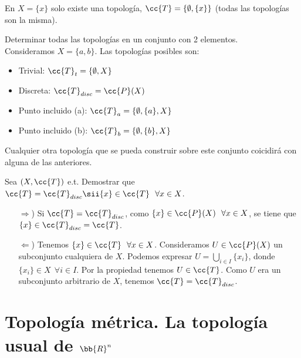 \begin{observacion}
    En $X=\{x\}$ solo existe una topología, $\cc{T}=\{\emptyset, \{x\}\}$ (todas las topologías son la misma).
    \endsquare
\end{observacion}

\begin{ejercicio}
    Determinar todas las topologías en un conjunto con 2 elementos.\\

    Consideramos $X=\{a,b\}$. Las topologías posibles son:
    \begin{itemize}
        \item Trivial: $\cc{T}_t=\{\emptyset, X\}$
        \item Discreta: $\cc{T}_{disc}=\cc{P}(X)$
        \item Punto incluido (a): $\cc{T}_a = \{\emptyset, \{a\}, X\}$
        \item Punto incluido (b): $\cc{T}_b = \{\emptyset, \{b\}, X\}$
    \end{itemize}
    Cualquier otra topología que se pueda construir sobre este conjunto coicidirá con alguna de las anteriores.
    \endsquare
\end{ejercicio}

\begin{ejercicio}
    Sea $(X, \cc{T})$ e.t. Demostrar que $\cc{T}=\cc{T}_{disc} \sii \{x\}\in \cc{T}\ \  \forall x \in X$. 
    \begin{itemize}
        \item[$\Rightarrow$)] Si $\cc{T} = \cc{T}_{disc}$, como $\{x\}\in \cc{P}(X) \ \ \forall x \in X$, se tiene que $\{x\}\in \cc{T}_{disc} = \cc{T}$.
        \item[$\Leftarrow$)] Tenemos $\{x\} \in \cc{T} \ \ \forall x \in X$. Consideramos $U \in \cc{P}(X)$ un subconjunto cualquiera de $X$. Podemos expresar $U=\bigcup\limits_{i\in I} \{x_i\}$, donde $\{x_i\} \in X \ \ \forall i \in I$. Por la propiedad  tenemos $U \in \cc{T}$. Como $U$ era un subconjunto arbitrario de $X$, tenemos $\cc{T}=\cc{T}_{disc}$.
    \end{itemize}
    \endsquare
\end{ejercicio}

\section{Topología métrica. La topología usual de $\bb{R}^n$}

